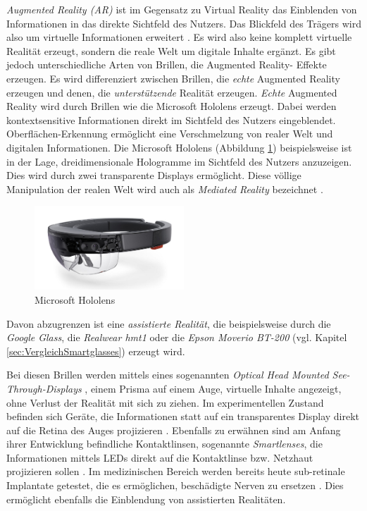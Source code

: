 \emph{Augmented Reality (AR)} ist im Gegensatz zu Virtual Reality das Einblenden von Informationen in das direkte Sichtfeld des Nutzers. Das Blickfeld des Trägers wird also um virtuelle Informationen erweitert \cite[S.~26]{Schwenke2016}. Es wird also keine komplett virtuelle Realität erzeugt, sondern die reale Welt um digitale Inhalte ergänzt. Es gibt jedoch unterschiedliche Arten von Brillen, die Augmented Reality- Effekte erzeugen. Es wird differenziert zwischen Brillen, die \emph{echte} Augmented Reality erzeugen und denen, die \emph{unterstützende} Realität erzeugen. \emph{Echte} Augmented Reality wird durch Brillen wie die Microsoft Hololens erzeugt. Dabei werden kontextsensitive Informationen direkt im Sichtfeld des Nutzers eingeblendet. Oberflächen-Erkennung ermöglicht eine Verschmelzung von realer Welt und digitalen Informationen. Die Microsoft Hololens (Abbildung \ref{fig:Microsoft_Hololens}) beispielsweise ist in der Lage, dreidimensionale Hologramme im Sichtfeld des Nutzers anzuzeigen. Dies wird durch zwei transparente Displays ermöglicht. Diese völlige Manipulation der realen Welt wird auch als \emph{Mediated Reality} bezeichnet \cite[S.~46]{Schwenke2016}.
%
\begin{figure}[htbp]
    \centering
    \includegraphics[width=0.5\textwidth]{data/bilder/Microsoft_Hololens.pdf}
    \caption{Microsoft Hololens \cite{O.V.}}
    \label{fig:Microsoft_Hololens}
\end{figure}
%

Davon abzugrenzen ist eine \emph{assistierte Realität}, die beispielsweise durch die \emph{Google Glass}, die \emph{Realwear hmt1} oder die \emph{Epson Moverio BT-200} (vgl. Kapitel \ref{sec:VergleichSmartglasses}) erzeugt wird.

Bei diesen Brillen werden mittels eines sogenannten \emph{Optical Head Mounted See-Through-Displays} \cite[S.~26]{Schwenke2016}, einem Prisma auf einem Auge, virtuelle Inhalte angezeigt, ohne Verlust der Realität mit sich zu ziehen. Im experimentellen Zustand befinden sich Geräte, die Informationen statt auf ein transparentes Display direkt auf die Retina des Auges projizieren \cite[S.~241]{Broll2013}. Ebenfalls zu erwähnen sind am Anfang ihrer Entwicklung befindliche Kontaktlinsen, sogenannte \emph{Smartlenses}, die Informationen mittels LEDs direkt auf die Kontaktlinse bzw. Netzhaut projizieren sollen \cite{Donath2014, Schwan2014}. Im medizinischen Bereich werden bereits heute sub-retinale Implantate getestet, die es ermöglichen, beschädigte Nerven zu ersetzen \cite{Young2013}. Dies ermöglicht ebenfalls die Einblendung von assistierten Realitäten.

